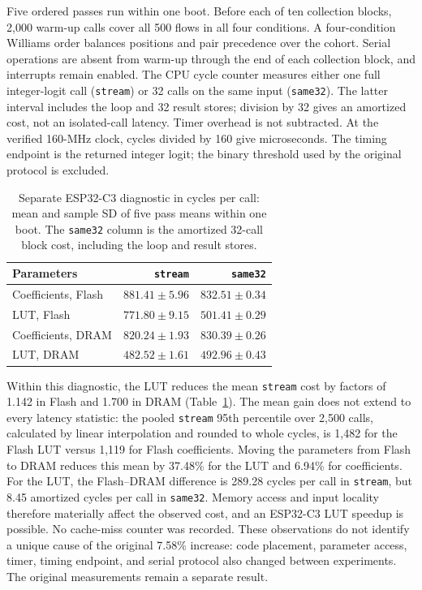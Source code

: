 \documentclass{ieeeaccess}
\begin{document}
Five ordered passes run within one boot. Before each of ten collection blocks, 2,000 warm-up calls cover all 500 flows in all four conditions. A four-condition Williams order balances positions and pair precedence over the cohort. Serial operations are absent from warm-up through the end of each collection block, and interrupts remain enabled. The CPU cycle counter measures either one full integer-logit call (\texttt{stream}) or 32 calls on the same input (\texttt{same32}). The latter interval includes the loop and 32 result stores; division by 32 gives an amortized cost, not an isolated-call latency. Timer overhead is not subtracted. At the verified 160-MHz clock, cycles divided by 160 give microseconds. The timing endpoint is the returned integer logit; the binary threshold used by the original protocol is excluded.

\begin{table}[t]
\caption{Separate ESP32-C3 diagnostic in cycles per call: mean and sample SD of five pass means within one boot. The \texttt{same32} column is the amortized 32-call block cost, including the loop and result stores.}
\label{tab:c3diagnostic}
\centering\footnotesize
\begin{tabular}{lrr}
\toprule
Parameters & \texttt{stream} & \texttt{same32}\\
\midrule
Coefficients, Flash & $881.41\pm5.96$ & $832.51\pm0.34$\\
LUT, Flash & $771.80\pm9.15$ & $501.41\pm0.29$\\
Coefficients, DRAM & $820.24\pm1.93$ & $830.39\pm0.26$\\
LUT, DRAM & $482.52\pm1.61$ & $492.96\pm0.43$\\
\bottomrule
\end{tabular}
\end{table}

Within this diagnostic, the LUT reduces the mean \texttt{stream} cost by factors of 1.142 in Flash and 1.700 in DRAM (Table~\ref{tab:c3diagnostic}). The mean gain does not extend to every latency statistic: the pooled \texttt{stream} 95th percentile over 2,500 calls, calculated by linear interpolation and rounded to whole cycles, is 1,482 for the Flash LUT versus 1,119 for Flash coefficients. Moving the parameters from Flash to DRAM reduces this mean by 37.48\% for the LUT and 6.94\% for coefficients. For the LUT, the Flash--DRAM difference is 289.28 cycles per call in \texttt{stream}, but 8.45 amortized cycles per call in \texttt{same32}. Memory access and input locality therefore materially affect the observed cost, and an ESP32-C3 LUT speedup is possible. No cache-miss counter was recorded. These observations do not identify a unique cause of the original 7.58\% increase: code placement, parameter access, timer, timing endpoint, and serial protocol also changed between experiments. The original measurements remain a separate result.
\end{document}

